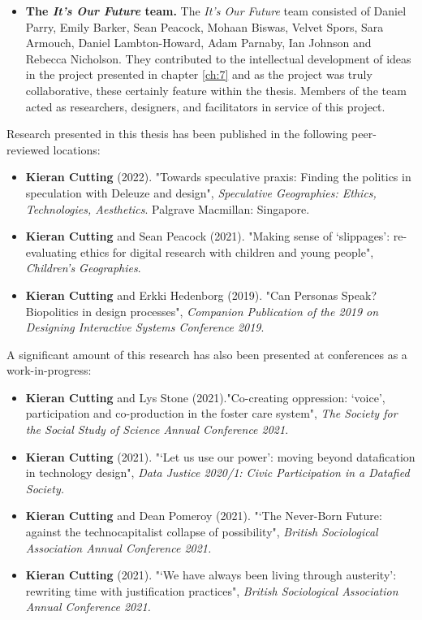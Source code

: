 \begin{publication}
\begin{itemize}
    \item \textbf{The \textit{It's Our Future} team.} The \textit{It's Our Future} team consisted of Daniel Parry, Emily Barker, Sean Peacock, Mohaan Biswas, Velvet Spors, Sara Armouch, Daniel Lambton-Howard, Adam Parnaby, Ian Johnson and Rebecca Nicholson. They contributed to the intellectual development of ideas in the project presented in chapter \ref{ch:7} and as the project was truly collaborative, these certainly feature within the thesis. Members of the team acted as researchers, designers, and facilitators in service of this project.
\end{itemize}
Research presented in this thesis has been published in the following peer-reviewed locations:
\begin{itemize}
    \item \textbf{Kieran Cutting} (2022). "Towards speculative praxis: Finding the politics in speculation with Deleuze and design", \textit{Speculative Geographies: Ethics, Technologies, Aesthetics}. Palgrave Macmillan: Singapore. 
    \item \textbf{Kieran Cutting} and Sean Peacock (2021). "Making sense of ‘slippages’: re-evaluating ethics for digital research with children and young people", \textit{Children’s Geographies}.
    \item \textbf{Kieran Cutting} and Erkki Hedenborg (2019). "Can Personas Speak? Biopolitics in design
processes", \textit{Companion Publication of the 2019 on Designing Interactive Systems Conference 2019}. 
\end{itemize}
A significant amount of this research has also been presented at conferences as a work-in-progress:
\begin{itemize}
    \item \textbf{Kieran Cutting} and Lys Stone (2021)."Co-creating oppression: ‘voice’, participation and co-production in the foster care system", \textit{The Society for the Social Study of Science Annual Conference 2021}.
    \item \textbf{Kieran Cutting} (2021). "‘Let us use our power’: moving beyond datafication in technology design", \textit{Data Justice 2020/1: Civic Participation in a Datafied Society.}
    \item \textbf{Kieran Cutting} and Dean Pomeroy (2021). "‘The Never-Born Future: against the technocapitalist collapse of possibility", \textit{British Sociological Association Annual Conference 2021.}
    \item \textbf{Kieran Cutting} (2021). "‘We have always been living through austerity’: rewriting time with justification practices", \textit{British Sociological Association Annual Conference 2021.}

\end{itemize}
\end{publication}
